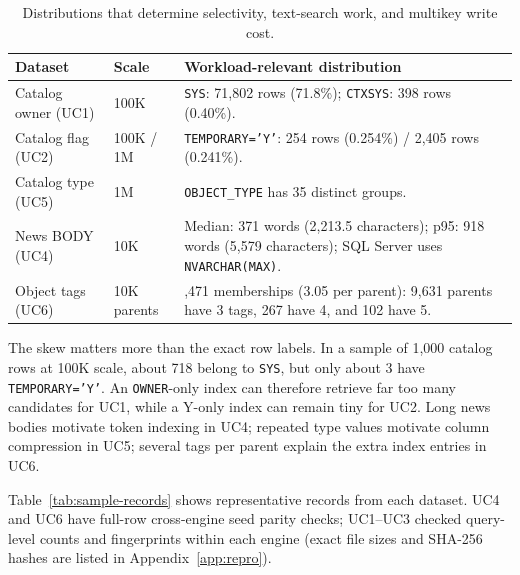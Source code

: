 \begin{table}[H]
\centering\small
\caption{Distributions that determine selectivity, text-search work, and multikey write cost.}
\label{tab:datasets}
\begin{tabularx}{\linewidth}{@{}l l >{\raggedright\arraybackslash}X@{}}
\toprule
Dataset & Scale & Workload-relevant distribution\\
\midrule
Catalog owner (UC1) & 100K & \texttt{SYS}: 71,802 rows (71.8\%); \texttt{CTXSYS}: 398 rows (0.40\%).\\
Catalog flag (UC2) & 100K / 1M & \texttt{TEMPORARY='Y'}: 254 rows (0.254\%) / 2,405 rows (0.241\%).\\
Catalog type (UC5) & 1M & \texttt{OBJECT\_TYPE} has 35 distinct groups.\\
News BODY (UC4) & 10K & Median: 371 words (2,213.5 characters); p95: 918 words (5,579 characters); SQL Server uses \texttt{NVARCHAR(MAX)}.\\
Object tags (UC6) & 10K parents & 30,471 memberships (3.05 per parent): 9,631 parents have 3 tags, 267 have 4, and 102 have 5.\\
\bottomrule
\end{tabularx}
\end{table}

The skew matters more than the exact row labels. In a sample of 1,000 catalog rows at 100K scale, about 718 belong to \texttt{SYS}, but only about 3 have \texttt{TEMPORARY='Y'}. An \texttt{OWNER}-only index can therefore retrieve far too many candidates for UC1, while a Y-only index can remain tiny for UC2. Long news bodies motivate token indexing in UC4; repeated type values motivate column compression in UC5; several tags per parent explain the extra index entries in UC6.

Table~\ref{tab:sample-records} shows representative records from each dataset. UC4 and UC6 have full-row cross-engine seed parity checks; UC1--UC3 checked query-level counts and fingerprints within each engine (exact file sizes and SHA-256 hashes are listed in Appendix~\ref{app:repro}).

